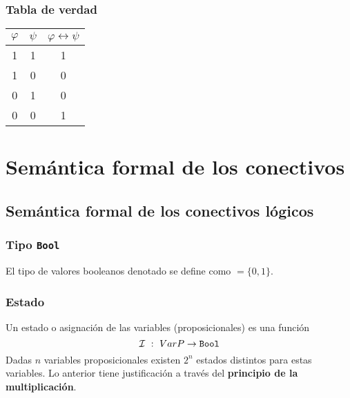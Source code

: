 \documentclass[a4paper]{article}
\begin{document}
\subsubsection{Tabla de verdad}
\begin{center}
    \begin{tabular}{ccc}
    $\varphi$ & \(\psi\) & $\varphi \leftrightarrow \psi$\\
    \midrule
    1 & 1 & 1 \\
    1 & 0 & 0 \\
    0 & 1 & 0 \\
    0 & 0 & 1 \\
    \end{tabular}
\end{center}
\section{Semántica formal de los conectivos}
\subsection{Semántica formal de los conectivos lógicos}
\subsubsection{Tipo \texttt{Bool}}
El tipo de valores booleanos denotado  se define como 
$=\{0,1\}$.
\subsubsection{Estado}
Un estado o asignación de las variables (proposicionales) es
una función
\[
    \mathcal{I} \ : \ VarP \to \text{\texttt{Bool}}
\]
Dadas $n$ variables proposicionales existen $2^n$ estados distintos
para estas variables. Lo anterior tiene justificación a través del 
\textbf{principio de la multiplicación}.
\end{document}
